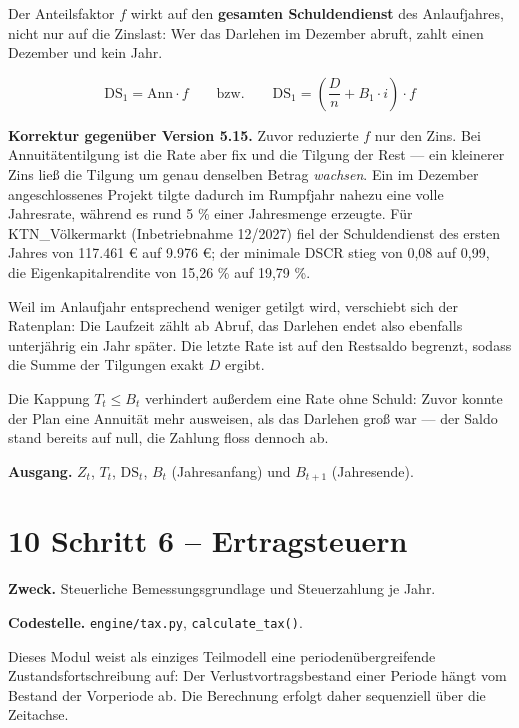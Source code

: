 \documentclass[
  a4paper,
  10pt]{article}
\renewenvironment{quote}
  {\begin{tcolorbox}[
      enhanced,
      breakable,
      colback=Wash,
      colframe=Brand,
      boxrule=0pt,
      leftrule=2.2pt,
      arc=0pt,
      left=8pt,right=8pt,top=6pt,bottom=6pt,
      before skip=8pt,after skip=9pt
    ]\small\color{InkSoft}}
  {\end{tcolorbox}}
\begin{document}
Der Anteilsfaktor \(f\) wirkt auf den \textbf{gesamten Schuldendienst}
des Anlaufjahres, nicht nur auf die Zinslast: Wer das Darlehen im
Dezember abruft, zahlt einen Dezember und kein Jahr.

\[ \mathrm{DS}_1 = \mathrm{Ann} \cdot f \qquad\text{bzw.}\qquad
\mathrm{DS}_1 = \left(\frac{D}{n} + B_1 \cdot i\right) \cdot f \]

\begin{quote}
\textbf{Korrektur gegenüber Version 5.15.} Zuvor reduzierte \(f\) nur
den Zins. Bei Annuitätentilgung ist die Rate aber fix und die Tilgung
der Rest --- ein kleinerer Zins ließ die Tilgung um genau denselben
Betrag \emph{wachsen}. Ein im Dezember angeschlossenes Projekt tilgte
dadurch im Rumpfjahr nahezu eine volle Jahresrate, während es rund 5 \%
einer Jahresmenge erzeugte. Für KTN\_Völkermarkt (Inbetriebnahme
12/2027) fiel der Schuldendienst des ersten Jahres von 117.461 € auf
9.976 €; der minimale DSCR stieg von 0,08 auf 0,99, die
Eigenkapitalrendite von 15,26 \% auf 19,79 \%.
\end{quote}

Weil im Anlaufjahr entsprechend weniger getilgt wird, verschiebt sich
der Ratenplan: Die Laufzeit zählt ab Abruf, das Darlehen endet also
ebenfalls unterjährig ein Jahr später. Die letzte Rate ist auf den
Restsaldo begrenzt, sodass die Summe der Tilgungen exakt \(D\) ergibt.

Die Kappung \(T_t \le B_t\) verhindert außerdem eine Rate ohne Schuld:
Zuvor konnte der Plan eine Annuität mehr ausweisen, als das Darlehen
groß war --- der Saldo stand bereits auf null, die Zahlung floss dennoch
ab.

\textbf{Ausgang.} \(Z_t\), \(T_t\), \(\mathrm{DS}_t\), \(B_t\)
(Jahresanfang) und \(B_{t+1}\) (Jahresende).

\hypertarget{schritt-6-ertragsteuern}{%
\section{10 Schritt 6 -- Ertragsteuern}\label{schritt-6-ertragsteuern}}

\textbf{Zweck.} Steuerliche Bemessungsgrundlage und Steuerzahlung je
Jahr.

\textbf{Codestelle.} \nolinkurl{engine/tax.py}, \texttt{calculate\_tax()}.

Dieses Modul weist als einziges Teilmodell eine periodenübergreifende
Zustandsfortschreibung auf: Der Verlustvortragsbestand einer Periode
hängt vom Bestand der Vorperiode ab. Die Berechnung erfolgt daher
sequenziell über die Zeitachse.
\end{document}
